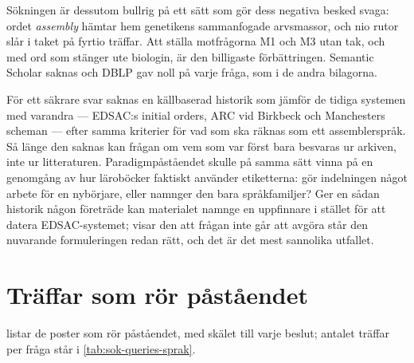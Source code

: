 Sökningen är dessutom bullrig på ett sätt som gör dess negativa besked
svaga: ordet \emph{assembly} hämtar hem genetikens sammanfogade
arvsmassor, och nio rutor slår i taket på fyrtio träffar.  Att ställa
motfrågorna M1 och M3 utan tak, och med ord som stänger ute biologin, är
den billigaste förbättringen.  Semantic Scholar saknas och DBLP gav noll
på varje fråga, som i de andra bilagorna.

För ett säkrare svar saknas en källbaserad historik som jämför de tidiga
systemen med varandra --- EDSAC:s \foreignlanguage{english}{initial
orders}, ARC vid Birkbeck och Manchesters scheman --- efter samma
kriterier för vad som ska räknas som ett assemblerspråk.  Så länge den
saknas kan frågan om vem som var först bara besvaras ur arkiven, inte ur
litteraturen.  Paradigmpåståendet skulle på samma sätt vinna på en
genomgång av hur läroböcker faktiskt använder etiketterna: gör
indelningen något arbete för en nybörjare, eller namnger den bara
språkfamiljer?  Ger en sådan historik någon företräde kan materialet
namnge en uppfinnare i stället för att datera EDSAC-systemet; visar den
att frågan inte går att avgöra står den nuvarande formuleringen redan
rätt, och det är det mest sannolika utfallet.

\section{Träffar som rör påståendet}
\label{sec:sprak-traffar}

 listar de poster som rör påståendet, med skälet till
varje beslut; antalet träffar per fråga står i
\cref{tab:sok-queries-sprak}.

